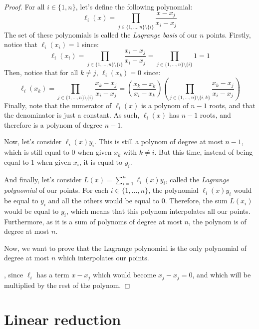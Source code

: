 \documentclass{article}
\theoremstyle{definition}
\theoremstyle{remark}
\theoremstyle{example}
\begin{document}
\begin{proof}
    For all $i \in \{1, n\}$, let's define the following polynomial:
        $$\ell_i(x) = \prod_{j \in \{1, \dots, n\} \setminus \{i\}} \frac{x - x_j}{x_i - x_j}$$
    The set of these polynomials is called the \textit{Lagrange basis} of our $n$ points. Firstly, notice that $\ell_i(x_i) = 1$ since:
        $$\ell_i(x_i) = \prod_{j \in \{1, \dots, n\} \setminus \{i\}} \frac{x_i - x_j}{x_i - x_j} = \prod_{j \in \{1, \dots, n\} \setminus \{i\}} 1 = 1$$
    Then, notice that for all $k \neq j$, $\ell_i(x_k) = 0$ since:
        $$\ell_i(x_k) = \prod_{j \in \{1, \dots, n\} \setminus \{i\}} \frac{x_k - x_j}{x_i - x_j} = \left(\frac{x_k - x_k}{x_i - x_k}\right)\left(\prod_{j \in \{1, \dots, n\} \setminus \{i, k\}} \frac{x_k - x_j}{x_i - x_j}\right)$$
    Finally, note that the numerator of $\ell_i(x)$ is a polynom of $n-1$ roots, and that the denominator is just a constant. As such, $\ell_i(x)$ has $n-1$ roots, and therefore is a polynom of degree $n-1$.

    Now, let's consider $\ell_i(x)y_i$. This is still a polynom of degree at most $n-1$, which is still equal to 0 when given $x_k$ with $k \neq i$. But this time, instead of being equal to 1 when given $x_i$, it is equal to $y_i$.

    And finally, let's consider $L(x) = \sum_{i=1}^n \ell_i(x)y_i$, called the \textit{Lagrange polynomial} of our points. For each $i \in \{1, \dots, n\}$, the polynomial $\ell_i(x)y_i$ would be equal to $y_i$ and all the others would be equal to 0. Therefore, the sum $L(x_i)$ would be equal to $y_i$, which means that this polynom interpolates all our points. Furthermore, as it is a sum of polynoms of degree at most $n$, the polynom is of degree at most $n$.

    Now, we want to prove that the Lagrange polynomial is the only polynomial of degree at most $n$ which interpolates our points.

, since $\ell_i$ has a term $x - x_j$ which would become $x_j - x_j = 0$, and which will be multiplied by the rest of the polynom.

    
\end{proof}



\section{Linear reduction}
\end{document}
